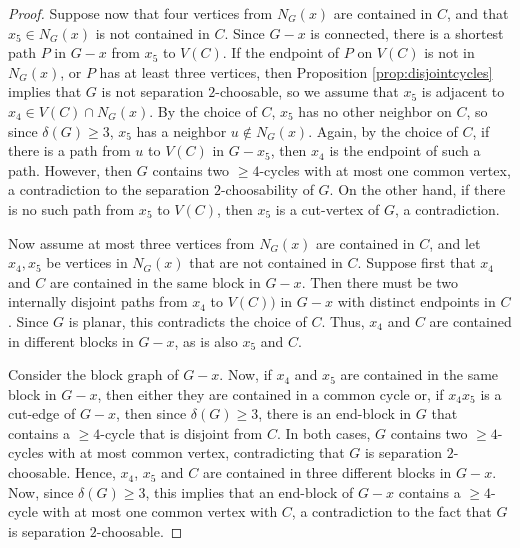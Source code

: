 \documentclass[10pt,a4paper]{amsart}
\begin{document}
\begin{proof}
Suppose now that four vertices from $N_G(x)$ are contained in $C$,
and that $x_5 \in N_G(x)$ is not contained in $C$.
Since $G-x$ is connected, there is a shortest path $P$ in $G-x$ from
$x_5$ to $V(C)$. If the endpoint of $P$ on $V(C)$ is not in $N_G(x)$,
or $P$ has at least three vertices, then Proposition \ref{prop:disjointcycles}
implies that $G$ is not separation $2$-choosable, so we assume
that $x_5$ is adjacent to $x_4 \in V(C) \cap N_G(x)$. 
By the choice of $C$, 
$x_5$ has no other neighbor on $C$, so since $\delta(G) \geq 3$,
$x_5$ has a neighbor $u \notin N_G(x)$. Again, by the choice
of $C$, if there is a path from $u$ to $V(C)$ in $G-x_5$, then
$x_4$ is the endpoint of such a path. However, then $G$ contains two $\geq 4$-cycles with
at most one common vertex, a contradiction to the separation $2$-choosability of $G$.
On the other hand, if there is no such path from $x_5$ to $V(C)$,
then $x_5$ is a cut-vertex of $G$, a contradiction.

Now assume at most three vertices from $N_G(x)$ are contained in $C$,
and let $x_4,x_5$ be vertices in $N_G(x)$ that are not contained in
$C$. Suppose first that $x_4$ and $C$ are contained in the same
block in $G-x$. Then there must be two internally disjoint paths from $x_4$ to $V(C))$ in $G-x$
with distinct endpoints in $C$. Since $G$ is planar,
this contradicts the choice
of $C$. Thus, $x_4$ and $C$ are contained in different blocks in $G-x$,
as is also $x_5$ and $C$. 

Consider the block graph of $G-x$. %
Now, if $x_4$ and $x_5$ are contained in the same block in $G-x$, then
either they are contained in a common cycle or, if $x_4x_5$
is a cut-edge of $G-x$, then since $\delta(G) \geq 3$, 
there is an end-block
in $G$ that contains a $\geq 4$-cycle that is disjoint from $C$. 
In both cases, $G$ contains 
two $\geq 4$-cycles with at most common vertex, 
contradicting that $G$ is
separation $2$-choosable. Hence, $x_4$, $x_5$ and $C$ are contained in
three different blocks in $G - x$. Now, since $\delta(G) \geq 3$, this 
implies that an end-block of $G-x$ contains a 
$\geq 4$-cycle with at most one
common vertex with $C$, a contradiction to the fact that $G$ is
separation $2$-choosable.
\end{proof}
\end{document}
